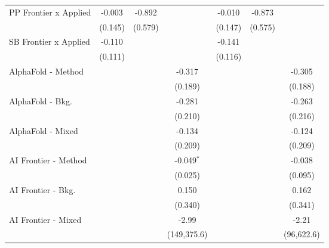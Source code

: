 \begin{tabular}{lcccccc}
   PP Frontier x Applied          & -0.003         & -0.892       &               & -0.010         & -0.873       &   \\   
                                  & (0.145)        & (0.579)      &               & (0.147)        & (0.575)      &   \\   
   SB Frontier x Applied          & -0.110         &              &               & -0.141         &              &   \\   
                                  & (0.111)        &              &               & (0.116)        &              &   \\   
   AlphaFold - Method             &                &              & -0.317        &                &              & -0.305\\   
                                  &                &              & (0.189)       &                &              & (0.188)\\   
   AlphaFold - Bkg.               &                &              & -0.281        &                &              & -0.263\\   
                                  &                &              & (0.210)       &                &              & (0.216)\\   
   AlphaFold - Mixed              &                &              & -0.134        &                &              & -0.124\\   
                                  &                &              & (0.209)       &                &              & (0.209)\\   
   AI Frontier - Method           &                &              & -0.049$^{*}$  &                &              & -0.038\\   
                                  &                &              & (0.025)       &                &              & (0.095)\\   
   AI Frontier - Bkg.             &                &              & 0.150         &                &              & 0.162\\   
                                  &                &              & (0.340)       &                &              & (0.341)\\   
   AI Frontier - Mixed            &                &              & -2.99         &                &              & -2.21\\   
                                  &                &              & (149,375.6)   &                &              & (96,622.6)\\   

\end{tabular}
